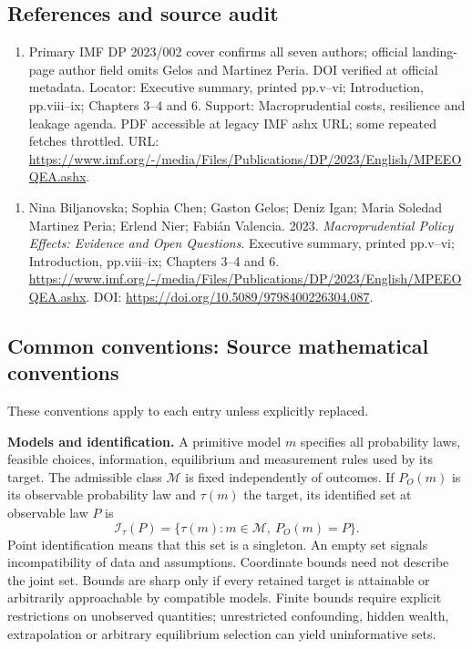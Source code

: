 \documentclass[11pt,a4paper]{article}
\begin{document}
\subsection*{References and source audit}
\begin{enumerate}
\item Primary IMF DP 2023/002 cover confirms all seven authors; official landing-page author field omits Gelos and Martinez Peria. DOI verified at official metadata. Locator: Executive summary, printed pp.v--vi; Introduction, pp.viii--ix; Chapters 3--4 and 6. Support: Macroprudential costs, resilience and leakage agenda. PDF accessible at legacy IMF ashx URL; some repeated fetches throttled. URL: \url{https://www.imf.org/-/media/Files/Publications/DP/2023/English/MPEEOQEA.ashx}.
\end{enumerate}
\begin{enumerate}\raggedright
\item\hypertarget{definitions:source:30007605:1}{} Nina Biljanovska; Sophia Chen; Gaston Gelos; Deniz Igan; Maria Soledad Martinez Peria; Erlend Nier; Fabián Valencia. 2023. \emph{Macroprudential Policy Effects: Evidence and Open Questions}. Executive summary, printed pp.v--vi; Introduction, pp.viii--ix; Chapters 3--4 and 6.
\url{https://www.imf.org/-/media/Files/Publications/DP/2023/English/MPEEOQEA.ashx}.
DOI: \url{https://doi.org/10.5089/9798400226304.087}.
\end{enumerate}

\subsection*{Common conventions: Source mathematical conventions}

These conventions apply to each entry unless explicitly replaced.

\textbf{Models and identification.} A primitive model \(m\) specifies all probability laws, feasible choices, information, equilibrium and measurement rules used by its target. The admissible class \(\mathcal M\) is fixed independently of outcomes. If \(P_O(m)\) is its observable probability law and \(\tau(m)\) the target, its identified set at observable law \(P\) is
\[
 \mathcal I_\tau(P)=\{\tau(m):m\in\mathcal M,\ P_O(m)=P\}.
\]
Point identification means that this set is a singleton. An empty set signals incompatibility of data and assumptions. Coordinate bounds need not describe the joint set. Bounds are sharp only if every retained target is attainable or arbitrarily approachable by compatible models. Finite bounds require explicit restrictions on unobserved quantities; unrestricted confounding, hidden wealth, extrapolation or arbitrary equilibrium selection can yield uninformative sets.
\end{document}
